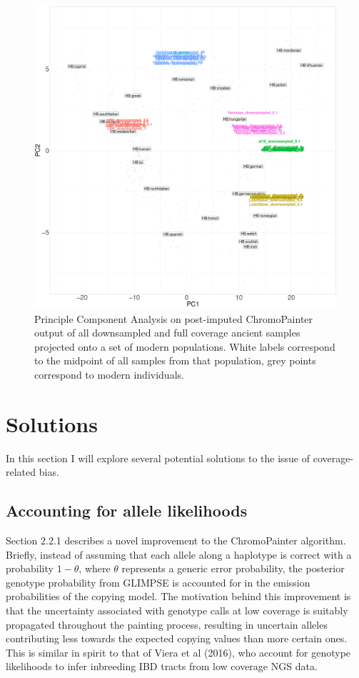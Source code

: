 \begin{figure}[htp]
    \centering
    \includegraphics[width=1.0\textwidth]{../images/chapter1/CP_unlinked_PCA.pdf}
    \caption{Principle Component Analysis on post-imputed ChromoPainter output of all downsampled and full coverage ancient samples projected onto a set of modern populations. White labels correspond to the midpoint of all samples from that population, grey points correspond to modern individuals.}
    \label{fig:CP_unlinked_PCA}
\end{figure}





\section{Solutions}

In this section I will explore several potential solutions to the issue of coverage-related bias.

\subsection{Accounting for allele likelihoods}

Section 2.2.1 describes a novel improvement to the ChromoPainter algorithm. Briefly, instead of assuming that each allele along a haplotype is correct with a probability $1-\theta$, where $\theta$ represents a generic error probability, the posterior genotype probability from GLIMPSE is accounted for in the emission probabilities of the copying model. The motivation behind this improvement is that the uncertainty associated with genotype calls at low coverage is suitably propagated throughout the painting process, resulting in uncertain alleles contributing less towards the expected copying values than more certain ones. This is similar in spirit to that of Viera et al (2016), who account for genotype likelihoods to infer inbreeding IBD tracts from low coverage NGS data.

